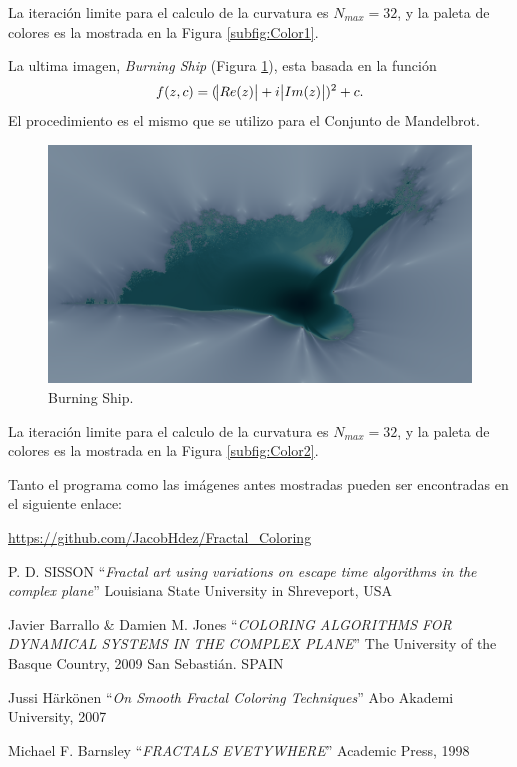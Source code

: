 \documentclass[12pt,letterpaper,final]{article}
\theoremstyle{plain}
\theoremstyle{definition}
\theoremstyle{remark}
\numberwithin{equation}{section}
\begin{document}
La iteración limite para el calculo de la curvatura es $N_{max} = 32$, y la paleta de colores es la mostrada en la Figura \ref{subfig:Color1}. \vspace{24pt}

\newpage
La ultima imagen, \textit{Burning Ship} (Figura \ref{fig:Burning Ship}), esta basada en la función
\[ f(z, c) = ( \abs{Re(z)} + i\abs{Im(z)} )^2 + c. \]
El procedimiento es el mismo que se utilizo para el Conjunto de Mandelbrot.

\begin{figure}[!hbtp]
\centering
\includegraphics[scale=0.5]{../src/curvature_estimation/Burning_Ship/results/Burning_Ship_32_960x540.png} 
\caption{Burning Ship.}
\label{fig:Burning Ship}
\end{figure}

La iteración limite para el calculo de la curvatura es $N_{max} = 32$, y la paleta de colores es la mostrada en la Figura \ref{subfig:Color2}.

\newpage
Tanto el programa como las imágenes antes mostradas pueden ser encontradas en el siguiente enlace: 
\begin{center}
\url{https://github.com/JacobHdez/Fractal_Coloring}
\end{center}

{}
\begin{thebibliography}{5}
	P. D. SISSON
	``\textit{Fractal art using variations on escape time algorithms in the complex plane}''
	Louisiana State University in Shreveport, USA
	
	Javier Barrallo \& Damien M. Jones
	``\textit{COLORING ALGORITHMS FOR DYNAMICAL SYSTEMS IN THE COMPLEX PLANE}''
	The University of the Basque Country, 2009 San Sebastián. SPAIN
	
	Jussi Härkönen
	``\textit{On Smooth Fractal Coloring Techniques}''
	Abo Akademi University, 2007
	
	Michael F. Barnsley
	``\textit{FRACTALS EVETYWHERE}''
	Academic Press, 1998
\end{thebibliography}
\end{document}

